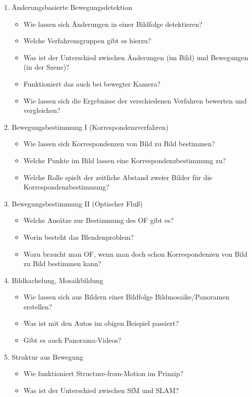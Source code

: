 \documentclass{report}
\begin{document}
\begin{itemize}
\begin{enumerate}
			\item Änderungsbasierte Bewegungsdetektion
			\begin{itemize}
				\item Wie lassen sich Änderungen in einer Bildfolge detektieren?
				\item Welche Verfahrensgruppen gibt es hierzu?
				\item Was ist der Unterschied zwischen Änderungen (im Bild) und Bewegungen (in der Szene)?
				\item Funktioniert das auch bei bewegter
				Kamera?
				\item Wie lassen sich die Ergebnisse der
				verschiedenen Verfahren bewerten und
				vergleichen?
			\end{itemize}
			
			\item Bewegungsbestimmung I (Korrespondenzverfahren)
			\begin{itemize}
				\item Wie lassen sich Korrespondenzen von Bild zu Bild bestimmen?
				\item Welche Punkte im Bild lassen eine Korrespondenzbestimmung zu?
				\item Welche Rolle spielt der zeitliche Abstand zweier Bilder für die Korrespondenzbestimmung?
			\end{itemize}
		
			\item Bewegungsbestimmung II (Optischer Fluß)
			\begin{itemize}
				\item Welche Ansätze zur Bestimmung des OF
				gibt es?
				\item Worin besteht das Blendenproblem?
				\item Wozu braucht man OF, wenn man doch
				schon Korrespondenzen von Bild zu Bild
				bestimmen kann?
			\end{itemize}
		
			\item Bildkachelung, Mosaikbildung
			\begin{itemize}
				\item Wie lassen sich aus Bildern einer Bildfolge Bildmosaike/Panoramen erstellen?
				\item Was ist mit den Autos im obigen Beispiel passiert?
				\item Gibt es auch Panorama-Videos?
			\end{itemize}
		
			\item Struktur aus Bewegung
			\begin{itemize}
				\item Wie funktioniert Structure-from-Motion im Prinzip?
				\item Was ist der Unterschied zwischen SfM und SLAM?
			\end{itemize}
		

\end{enumerate}
\end{itemize}
\end{document}
